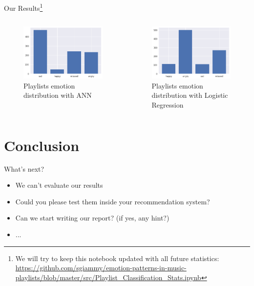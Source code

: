 \documentclass[xcolor=dvipsnames]{beamer}
\begin{document}
\begin{frame}{Our Results\footnote{We will try to keep this notebook updated with all future statistics: \url{https://github.com/sgiammy/emotion-patterns-in-music-playlists/blob/master/src/Playlist_Classification_Stats.ipynb}}}
\begin{columns}
\begin{figure}
	\includegraphics[scale=0.45,left]{./images/playlist-emotion-distribution-ann}
	\caption{Playlists emotion distribution with ANN}
\end{figure}

\begin{figure}
	\includegraphics[scale=0.45,left]{./images/playlist-emotion-distribution-logreg}
	\caption{Playlists emotion distribution with Logistic Regression}
\end{figure}
\end{columns}
\end{frame}


\section{Conclusion}

\begin{frame}{What's next?}
\begin{itemize}
\item We can't evaluate our results
\item Could you please test them inside your recommendation system?
\item Can we start writing our report? (if yes, any hint?)
\item ...
\end{itemize}
\end{frame}

\end{document}
